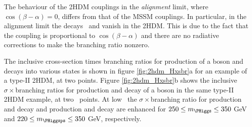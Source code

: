 The behaviour of the \ac{2HDM} couplings in the \textit{alignment} limit,
where $\cos{(\beta-\alpha)} = 0$, differs from that of the \ac{MSSM} couplings.
In particular, in the alignment limit the decays \AtoZh~and \Htohh vanish
in the \ac{2HDM}. This is due to the fact that the coupling is 
proportional to $\cos{(\beta-\alpha)}$ and there are no radiative corrections
to make the branching ratio nonzero.

The inclusive cross-section times branching ratios for production of a \PHiggs boson 
and decays into various states is shown in figure \ref{fig:2hdm_Hxsbr}a for an 
example of a type-II \ac{2HDM}, at two \tanb points. Figure \ref{fig:2hdm_Hxsbr}b 
shows the inclusive $\sigma\times$branching ratios for production and decay
of a \PHiggsps boson in the same type-II \ac{2HDM} example, at two \tanb~points. At
low \tanb~the $\sigma\times$branching ratio for \Htohh production and decay and \AtoZh production
and decay are enhanced for $250\leq m_{\PHiggs}\leq 350$ GeV and $220 \leq m_{\PHiggsps} \leq 350$ GeV, respectively.


